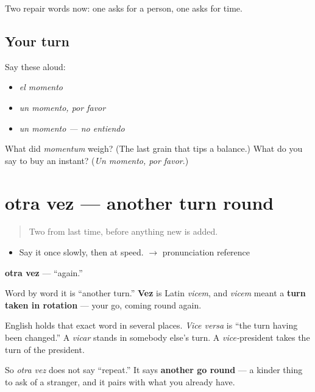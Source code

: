 \begin{grammarlens}[title={What you've built}]
Two repair words now: one asks for a person, one asks for time.
\end{grammarlens}

\subsection*{Your turn}
Say these aloud:

\begin{itemize}
\raggedright
  \item \emph{el momento}
  \item \emph{un momento, por favor}
  \item \emph{un momento — no entiendo}
\end{itemize}

\begin{tcolorbox}[breakable,colback=teal!4,colframe=teal!35!black,title={Before you move on}]
What did \emph{momentum} weigh? (The last grain that tips a balance.) What do you say to buy an instant? (\emph{Un momento, por favor}.)
\end{tcolorbox}
\section[otra vez]{otra vez — another turn round}

\label{lesson:ES-C303-otra-vez}



\begin{quote}
Two from last time, before anything new is added.
\end{quote}

\begin{sounds}
\begin{itemize}
\raggedright
  \item Say it once slowly, then at speed. $\to$ pronunciation reference
\end{itemize}
\end{sounds}

\begin{cousinweb}
\textbf{otra vez} — \textquotedblleft{}again.\textquotedblright{}

Word by word it is \textquotedblleft{}another turn.\textquotedblright{} \textbf{Vez} is Latin \emph{vicem}, and \emph{vicem} meant a \textbf{turn taken in rotation} — your go, coming round again.

English holds that exact word in several places. \emph{Vice versa} is \textquotedblleft{}the turn having been changed.\textquotedblright{} A \emph{vicar} stands in somebody else's turn. A \emph{vice-}president takes the turn of the president.

So \emph{otra vez} does not say \textquotedblleft{}repeat.\textquotedblright{} It says \textbf{another go round} — a kinder thing to ask of a stranger, and it pairs with what you already have.
\end{cousinweb}

